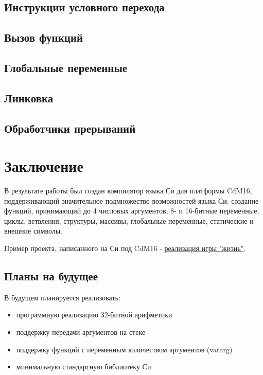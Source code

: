 \documentclass[a4paper,14pt]{extarticle}
\begin{document}
\subsection{Инструкции условного перехода}
\subsection{Вызов функций}
\subsection{Глобальные переменные}
\subsection{Линковка}
\subsection{Обработчики прерываний}

\pagebreak
\section{Заключение}

В результате работы был создан компилятор языка Си для платформы CdM16, поддерживающий значительное подмножество возможностей языка Си: создание функций, принимающий до 4 числовых аргументов, 8- и 16-битные переменные, циклы, ветвления, структуры, массивы, глобальные переменные, статические и внешние символы.

Пример проекта, написанного на Си под CdM16 - \href{https://github.com/leadpogrommer/llvm-project-cdm/tree/backend/cdm/llvm/test_cdm/life_multifile}{реализация игры "жизнь"}.

\subsection{Планы на будущее}

В будущем планируется реализовать:
\begin{itemize}
	\item программную реализацию 32-битной арифметики
	\item поддержку передачи аргументов на стеке
	\item поддержку функций с переменным количеством аргументов (vararg)
	\item минимальную стандартную библиотеку Си
\end{itemize}


\pagebreak
\printbibliography
{}




	
\end{document}
